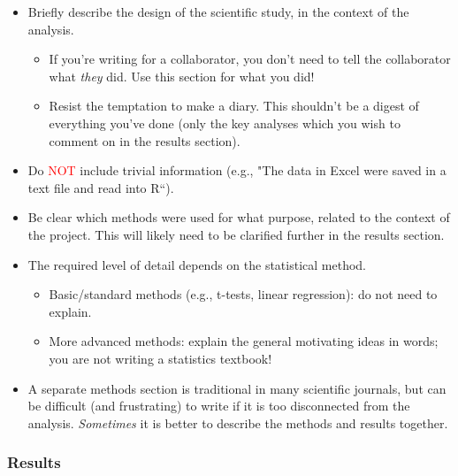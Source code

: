 \documentclass[
  openany]{book}
\providecommand{\tightlist}{%
  \setlength{\itemsep}{0pt}\setlength{\parskip}{0pt}}
\begin{document}
\begin{itemize}
\tightlist
\item
  Briefly describe the design of the scientific study, in the context of the analysis.

  \begin{itemize}
  \tightlist
  \item
    If you're writing for a collaborator, you don't need to tell the collaborator what \emph{they} did. Use this section for what you did!
  \item
    Resist the temptation to make a diary. This shouldn't be a digest of everything you've done (only the key analyses which you wish to comment on in the results section).
  \end{itemize}
\item
  Do \textcolor{red}{NOT} include trivial information (e.g., "The data in Excel were saved in a text file and read into R``).
\item
  Be clear which methods were used for what purpose, related to the context of the project. This will likely need to be clarified further in the results section.
\item
  The required level of detail depends on the statistical method.

  \begin{itemize}
  \tightlist
  \item
    Basic/standard methods (e.g., t-tests, linear regression): do not need to explain.
  \item
    More advanced methods: explain the general motivating ideas in words; you are not writing a statistics textbook!
  \end{itemize}
\item
  A separate methods section is traditional in many scientific journals, but can be difficult (and frustrating) to write if it is too disconnected from the analysis. \emph{Sometimes} it is better to describe the methods and results together.
\end{itemize}

\hypertarget{resultsreport}{%
\subsubsection{Results}\label{resultsreport}}
\end{document}
